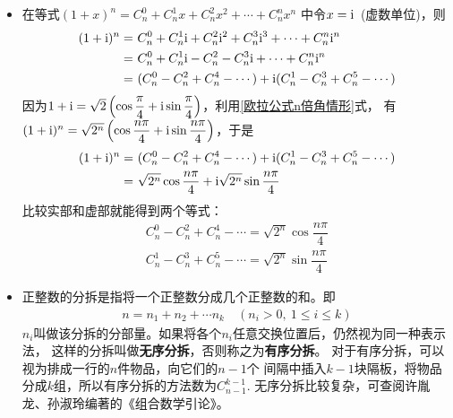 \begin{itemize}[leftmargin=\inteval{\myitemleftmargin}pt,itemsep=
   \inteval{\myitemitempsep}pt,topsep=\inteval{\myitemtopsep}pt]
\item 在等式$ (1+x)^n=C_n^0+C_n^1x+C_n^2x^2+\cdots + C_n^nx^n $
中令$ x=\mathrm{i} $\ (虚数单位)，则
\begin{align*}
    (1+\mathrm{i})^n=&\ C_n^0+C_n^1\mathrm{i}+C_n^2\mathrm{i}^2+C_n^3\mathrm{i}^3+
    \cdots + C_n^n\mathrm{i}^n  \\
    =&\ C_n^0+C_n^1\mathrm{i}-C_n^2-C_n^3\mathrm{i}+
    \cdots + C_n^n\mathrm{i}^n  \\
    =&\ (C_n^0-C_n^2+C_n^4-\cdots)+\mathrm{i} (C_n^1-C_n^3+C_n^5-\cdots)
\end{align*}
因为$ 1+\mathrm{i}=\sqrt{2}\left(\cos\dfrac{\pi}{4}+
\mathrm{i}\sin\dfrac{\pi}{4}\right) $，利用\eqref{欧拉公式n倍角情形}式，
有$ (1+\mathrm{i})^{n}=\sqrt{2^{n}}\left(\cos\dfrac{n\pi}{4}
+\mathrm{i}\sin\dfrac{n\pi}{4}\right) $，于是
\begin{align*}
    (1+\mathrm{i})^{n}
    =&\ (C_n^0-C_n^2+C_n^4-\cdots)+\mathrm{i} (C_n^1-C_n^3+C_n^5-\cdots)\\
    =&\ \sqrt{2^{n}}\cos\dfrac{n\pi}{4}
    +\mathrm{i}\sqrt{2^{n}}\sin\dfrac{n\pi}{4}
\end{align*}
比较实部和虚部就能得到两个等式：
\begin{gather*}
    C_n^0-C_n^2+C_n^4-\cdots=\sqrt{2^{n}}\cos\dfrac{n\pi}{4} \\
    C_n^1-C_n^3+C_n^5-\cdots=\sqrt{2^{n}}\sin\dfrac{n\pi}{4}
\end{gather*}

\item 正整数的分拆是指将一个正整数分成几个正整数的和。即
\begin{align*}
    n=n_1+n_2+\cdots n_k \quad (n_i>0,\ 1\leq i\leq k)
\end{align*}
$ n_i $叫做该分拆的分部量。如果将各个$ n_i $任意交换位置后，仍然视为同一种表示法，
这样的分拆叫做\textbf{无序分拆}，否则称之为\textbf{有序分拆}。
对于有序分拆，可以视为排成一行的$ n $件物品，向它们的$ n-1 $个
间隔中插入$ k-1 $块隔板，将物品分成$ k $组，所以有序分拆的方法数为$ C_{n-1}^{k-1} $. 
无序分拆比较复杂，可查阅许胤龙、孙淑玲编著的《组合数学引论》。


\end{itemize}
